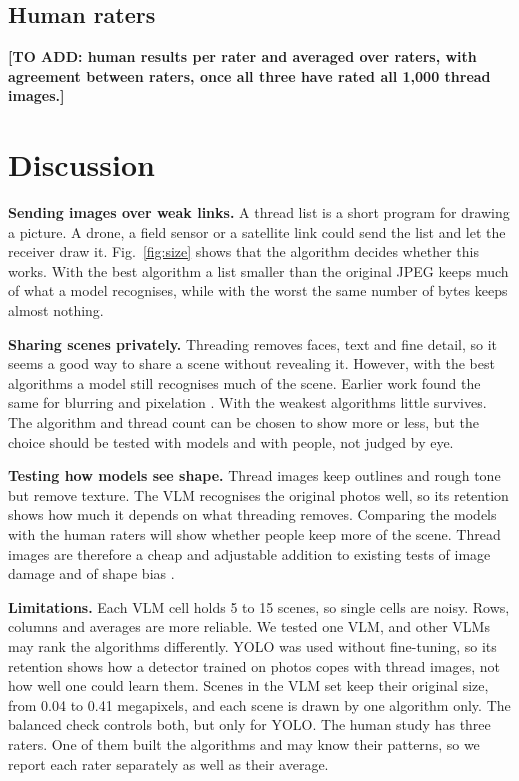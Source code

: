 \documentclass[conference]{IEEEtran}
\newcommand{\todo}[1]{\textbf{[TO ADD: #1]}}
\begin{document}


\subsection{Human raters}
\label{sec:human}

\todo{human results per rater and averaged over raters, with agreement between raters, once all three have rated all 1,000 thread images.}

\section{Discussion}

\textbf{Sending images over weak links.} A thread list is a short program for drawing a picture. A drone, a field sensor or a satellite link could send the list and let the receiver draw it. Fig.~\ref{fig:size} shows that the algorithm decides whether this works. With the best algorithm a list smaller than the original JPEG keeps much of what a model recognises, while with the worst the same number of bytes keeps almost nothing.

\textbf{Sharing scenes privately.} Threading removes faces, text and fine detail, so it seems a good way to share a scene without revealing it. However, with the best algorithms a model still recognises much of the scene. Earlier work found the same for blurring and pixelation \cite{mcpherson2016}. With the weakest algorithms little survives. The algorithm and thread count can be chosen to show more or less, but the choice should be tested with models and with people, not judged by eye.

\textbf{Testing how models see shape.} Thread images keep outlines and rough tone but remove texture. The VLM recognises the original photos well, so its retention shows how much it depends on what threading removes. Comparing the models with the human raters will show whether people keep more of the scene. Thread images are therefore a cheap and adjustable addition to existing tests of image damage \cite{hendrycks2019,michaelis2019} and of shape bias \cite{geirhos2019texture}.

\textbf{Limitations.} Each VLM cell holds 5 to 15 scenes, so single cells are noisy. Rows, columns and averages are more reliable. We tested one VLM, and other VLMs may rank the algorithms differently. YOLO was used without fine-tuning, so its retention shows how a detector trained on photos copes with thread images, not how well one could learn them. Scenes in the VLM set keep their original size, from 0.04 to 0.41 megapixels, and each scene is drawn by one algorithm only. The balanced check controls both, but only for YOLO. The human study has three raters. One of them built the algorithms and may know their patterns, so we report each rater separately as well as their average.
\end{document}
